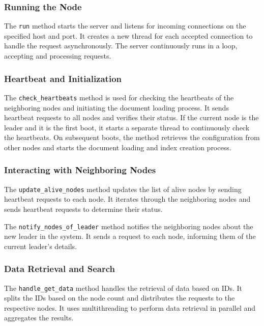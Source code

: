 \documentclass{article}
\begin{document}
\subsubsection*{Running the Node}

The \texttt{run} method starts the server and listens for incoming connections on the specified 
host and port. It creates a new thread for each accepted connection to handle the request 
asynchronously. The server continuously runs in a loop, accepting and processing requests.


\subsubsection*{Heartbeat and Initialization}

The \texttt{check\_heartbeats} method is used for checking the heartbeats of the neighboring 
nodes and initiating the document loading process. It sends heartbeat requests to all nodes and 
verifies their status. If the current node is the leader and it is the first boot, it starts a 
separate thread to continuously check the heartbeats. On subsequent boots, the method retrieves 
the configuration from other nodes and starts the document loading and index creation process.

\subsubsection*{Interacting with Neighboring Nodes}

The \texttt{update\_alive\_nodes} method updates the list of alive nodes by sending heartbeat 
requests to each node. It iterates through the neighboring nodes and sends heartbeat requests to 
determine their status.

The \texttt{notify\_nodes\_of\_leader} method notifies the neighboring nodes about the new 
leader in the system. It sends a request to each node, informing them of the current leader's 
details.

\subsubsection*{Data Retrieval and Search}

The \texttt{handle\_get\_data} method handles the retrieval of data based on IDs. It splits the 
IDs based on the node count and distributes the requests to the respective nodes. It uses 
multithreading to perform data retrieval in parallel and aggregates the results.
\end{document}
